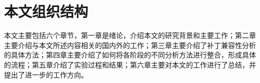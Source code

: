 %		
%		

%
%
%
%
%


\section{本文组织结构}

本文主要包括六个章节，第一章是绪论，介绍本文的研究背景和主要工作；第二章主要介绍与本文所述内容相关的国内外的工作；第三章主要介绍了补丁兼容性分析的具体方法；第四章主要介绍了如何将各阶段的不同分析方法进行整合，形成具体的流程；第五章介绍了实验过程和结果；第六章主要对本文的工作进行了总结，并提出了进一步的工作方向。


